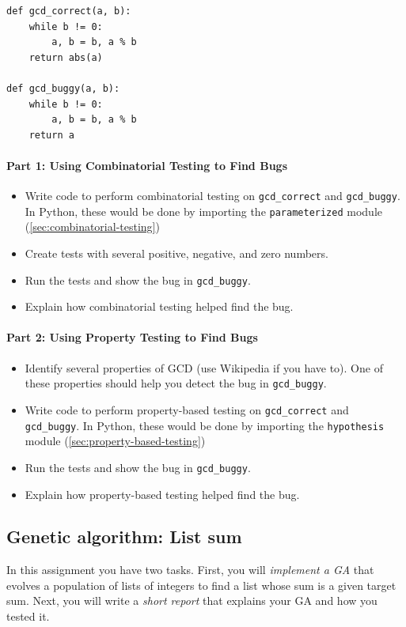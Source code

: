 \documentclass[oneside,11pt,dvipsnames]{book}
\newcommand{\code}[1]{\texttt{#1}}
\begin{document}
\begin{lstlisting}[multicols=2]
def gcd_correct(a, b):
    while b != 0:
        a, b = b, a % b
    return abs(a)

def gcd_buggy(a, b):
    while b != 0:
        a, b = b, a % b
    return a
\end{lstlisting}

\paragraph{Part 1: Using Combinatorial Testing to Find Bugs}
\begin{itemize} 
    \item Write code to perform combinatorial testing on \code{gcd\_correct} and \code{gcd\_buggy}. In Python, these would be done by importing the \code{parameterized} module (\autoref{sec:combinatorial-testing})
    \item Create tests with several positive, negative, and zero numbers.
    \item Run the tests and show the bug in \code{gcd\_buggy}.  
    \item Explain how combinatorial testing helped find the bug.
\end{itemize}

\paragraph{Part 2: Using Property Testing to Find Bugs}
\begin{itemize}
\item Identify several properties of GCD (use Wikipedia if you have to). One of these properties should help you detect the bug in \code{gcd\_buggy}.
\item Write code to perform property-based testing on \code{gcd\_correct} and \code{gcd\_buggy}. In Python, these would be done by importing the \code{hypothesis} module (\autoref{sec:property-based-testing})
\item Run the tests and show the bug in \code{gcd\_buggy}.
\item Explain how property-based testing helped find the bug.
\end{itemize}


\subsection{Genetic algorithm: List sum}\label{exercise:list-sum-ga}
In this assignment you have two tasks. First, you will \emph{implement a GA} that evolves a population of lists of integers to find a list whose sum is a given target sum. Next, you will write a \emph{short report} that explains your GA and how you tested it.
\end{document}
